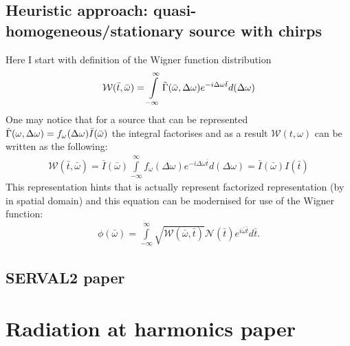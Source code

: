 \subsection{Heuristic approach: quasi- homogeneous/stationary source with chirps}
    Here I start with definition of the Wigner function distribution 
    \begin{align}
        \mathcal{W}(\bar{t}, \bar{\omega}) = \int \limits_{-\infty}^{\infty} \Tilde{\Gamma}(\bar{\omega}, \Delta \omega) e^{-i\Delta \omega \bar{t}}d(\Delta \omega)
    \end{align}
    One may notice that for a source that can be represented $\Tilde{\Gamma}(\omega, \Delta \omega) = f_{\omega}(\Delta \omega)\bar{I}(\bar{\omega})$ the integral factorises and as a result $\mathcal{W}(t, \omega)$ can be written as the following:
    \begin{align}
        \mathcal{W}(\bar{t}, \bar{\omega}) = \bar{I}(\bar{\omega}) \int \limits_{-\infty}^{\infty} f_{\omega}(\Delta \omega) e^{-i\Delta \omega \bar{t}}d(\Delta \omega) = \bar{I}(\bar{\omega}) I(\bar{t})
    \end{align}
    This representation hints that  is actually represent factorized representation (by in spatial domain) and this equation can be modernised for use of the Wigner function:
    \begin{align}
    	\phi(\bar{\omega}) = \int \limits_{-\infty}^{\infty} \sqrt{\mathcal{W}(\bar{\omega}, \bar{t})} \mathcal{N}(\bar{t}) e^{i \bar{\omega} \bar{t}} d\bar{t}.
    	\label{Eq:Field_Wigner}
    \end{align}
    \subsection{SERVAL2 paper}
    


\section{Radiation at harmonics paper}

